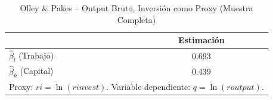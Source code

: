 \begin{table}[H]
\centering
\caption{Olley \& Pakes -- Output Bruto, Inversión como Proxy (Muestra Completa)}
\begin{tabular}{lc}
\toprule
 & Estimación \\
\midrule
$\hat{\beta}_l$ (Trabajo) & 0.693 \\
$\hat{\beta}_k$ (Capital) & 0.439 \\
\bottomrule
\multicolumn{2}{l}{\small Proxy: $ri = \ln(\mathit{rinvest})$. Variable dependiente: $q = \ln(\mathit{routput})$.}
\end{tabular}
\end{table}
